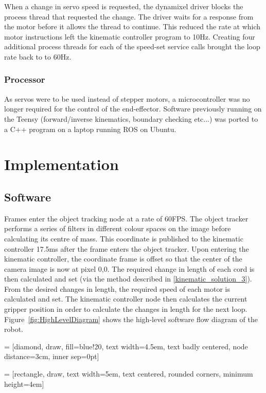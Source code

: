 \documentclass[conference]{IEEEtran}
\begin{document}
	When a change in servo speed is requested, the dynamixel driver blocks the process thread that requested the change. The driver waits for a response from the motor before it allows the thread to continue. This reduced the rate at which motor instructions left the kinematic controller program to 10Hz. Creating four additional process threads for each of the speed-set service calls brought the loop rate back to to 60Hz.
	
	\subsubsection{Processor}
	As servos were to be used instead of stepper motors, a microcontroller was no longer required for the control of the end-effector. Software previously running on the Teensy (forward/inverse kinematics, boundary checking etc...) was ported to a C++ program on a laptop running ROS on Ubuntu. 

	
	
	\section{Implementation}
	\subsection{Software}
	Frames enter the object tracking node at a rate of 60FPS. The object tracker performs a series of filters in different colour spaces on the image before calculating its centre of mass. This coordinate is published to the kinematic controller 17.5ms after the frame enters the object tracker. Upon entering the kinematic controller, the coordinate frame is offset so that the center of the camera image is now at pixel 0,0. The required change in length of each cord is then calculated and set (via the method described in \ref{kinematic_solution_3}). From the desired changes in length, the required speed of each motor is calculated and set. The kinematic controller node then calculates the current gripper position in order to calculate the changes in length for the next loop.
	Figure~\ref{fig:HighLevelDiagram} shows the high-level software flow diagram of the robot.

	
	
	 = [diamond, draw, fill=blue!20, 
	text width=4.5em, text badly centered, node distance=3cm, inner sep=0pt]
	
	 = [rectangle, draw, 
	text width=5em, text centered, rounded corners, minimum height=4em]
	
\end{document}
